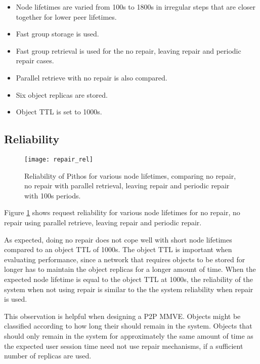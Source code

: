\begin{itemize}
\item Node lifetimes are varied from 100s to 1800s in irregular steps that are closer together for lower peer lifetimes.

\item Fast group storage is used.

\item Fast group retrieval is used for the no repair, leaving repair and periodic repair cases.

\item Parallel retrieve with no repair is also compared.

\item Six object replicas are stored.

\item Object TTL is set to 1000s.
\end{itemize}

\subsection{Reliability}

\begin{figure}[htbp]
 \centering
 \texttt{[image: repair\_rel]}
 \caption{Reliability of Pithos for various node lifetimes, comparing no repair, no repair with parallel retrieval, leaving repair and periodic repair with 100s periods.}
 \label{fig_repair_rel}
\end{figure}
%
Figure \ref{fig_repair_rel} shows request reliability for various node lifetimes for no repair, no repair using parallel retrieve, leaving repair and periodic repair.

As expected, doing no repair does not cope well with short node lifetimes compared to an object TTL of 1000s. The object TTL is important when evaluating performance, since a network that requires objects to be stored for longer has to maintain the object replicas for a longer amount of time. When the expected node lifetime is equal to the object TTL at 1000s, the reliability of the system when not using repair is similar to the the system reliability when repair is used.

This observation is helpful when designing a P2P MMVE. Objects might be classified according to how long their should remain in the system. Objects that should only remain in the system for approximately the same amount of time as the expected user session time need not use repair mechanisms, if a sufficient number of replicas are used.

